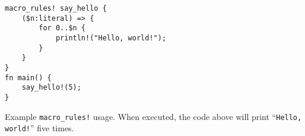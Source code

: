 \begin{listing}
    \centering
    \begin{verbatim}
macro_rules! say_hello {
    ($n:literal) => {
        for 0..$n {
            println!("Hello, world!");
        }
    }
}
fn main() {
    say_hello!(5);
}
    \end{verbatim}
    \caption{Example \texttt{macro\_rules!} usage.
        When executed, the code above will print “\texttt{Hello, world!}” five times.}
    \label{lst:rust-macro-rules}
\end{listing}